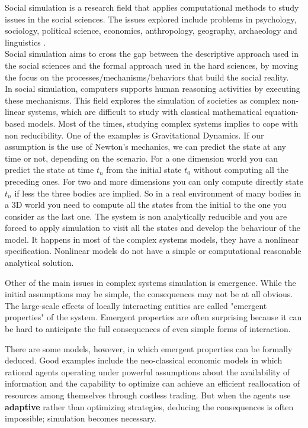 \documentclass[11pt,oneside,a4paper,openright]{report}
\begin{document}
Social simulation is a research field that applies computational methods to study issues in the social sciences. The issues explored include problems in psychology, sociology, political science, economics, anthropology, geography, archaeology and linguistics \cite{TakahashiSallachRouchier2007}.\\
Social simulation aims to cross the gap between the descriptive approach used in the social sciences and the formal approach used in the hard sciences, by moving the focus on the processes/mechanisms/behaviors that build the social reality.\\
In social simulation, computers supports human reasoning activities by executing these mechanisms. This field explores the simulation of societies as complex non-linear systems, which are difficult to study with classical mathematical equation-based models.
Most of the times, studying complex systems implies to cope with non reducibility. One of the examples is Gravitational Dynamics. If our assumption is the use of Newton's mechanics, we can predict the state at any time or not, depending on the scenario. For a one dimension world you can predict the state at time $t_n$ from the initial state $t_0$ without computing all the preceding ones. For two and more dimensions you can only compute directly state $t_n$ if less the three bodies are implied. So in a real environment of many bodies in a 3D world you need to compute all the states from the initial to the one you consider as the last one. The system is non analytically reducible and you are forced to apply simulation to visit all the states and develop the behaviour of the model. It happens in most of the complex systems models, they have a nonlinear specification. Nonlinear models do not have a simple or computational reasonable analytical solution. 

Other of the main issues in complex systems simulation is emergence. While the initial assumptions may be simple, the consequences may not be at all obvious. The large-scale effects of locally interacting entities are called "emergent properties" of the system. Emergent properties are often surprising because it can be hard to anticipate the full consequences of even simple forms of interaction. 

There are some models, however, in which emergent properties can be formally deduced. Good examples include the neo-classical economic models in which rational agents operating under powerful assumptions about the availability of information and the capability to optimize can achieve an efficient reallocation of resources among themselves through costless trading. But when the agents use \textbf{adaptive} rather than optimizing strategies, deducing the consequences is often impossible; simulation becomes necessary.
\end{document}
